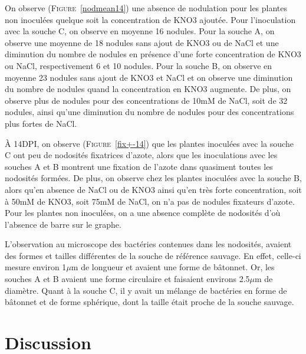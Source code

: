 \documentclass[12pt,a4paper,onecolumn]{article}
\begin{document}
\begin{multicols}{2}
			On observe (\textsc{Figure}~\ref{nodmean14}) une absence de nodulation pour les plantes non inoculées quelque soit la concentration de KNO3 ajoutée. Pour l’inoculation avec la souche C, on observe en moyenne 16 nodules. Pour la souche A, on observe une moyenne de 18 nodules sans ajout de KNO3 ou de NaCl et une diminution du nombre de nodules en présence d’une forte concentration de KNO3 ou NaCl, respectivement 6 et 10 nodules. Pour la souche B, on observe en moyenne 23 nodules sans ajout de KNO3 et NaCl et on observe une diminution du nombre de nodules quand la concentration en KNO3 augmente. De plus, on observe plus de nodules pour des concentrations de 10mM de NaCl, soit de 32 nodules, ainsi qu’une diminution du nombre de nodules pour des concentrations plus fortes de NaCl.



			À 14DPI, on observe (\textsc{Figure}~\ref{fix+-14}) que les plantes inoculées avec la souche C ont peu de nodosités fixatrices d’azote, alors que les inoculations avec les souches A et B montrent une fixation de l’azote dans quasiment toutes les nodosités formées. De plus, on observe chez les plantes inoculées avec la souche B, alors qu’en absence de NaCl ou de KNO3 ainsi qu'en très forte concentration, soit à 50mM de KNO3, soit 75mM de NaCl, on n’a pas de nodules fixateurs d’azote. Pour les plantes non inoculées, on a une absence complète de nodosités d’où l’absence de barre sur le graphe.


			L’observation au microscope des bactéries contenues dans les nodosités, avaient des formes et tailles différentes de la souche de référence sauvage. En effet, celle-ci mesure environ 1$\mu$m de longueur et avaient une forme de bâtonnet. Or, les souches A et B avaient une forme circulaire et faisaient environs 2.5$\mu$m de diamètre. Quant à la souche C, il y avait un mélange de bactéries en forme de bâtonnet et de forme sphérique, dont la taille était proche de la souche sauvage.

			\section{Discussion}


\end{multicols}
\end{document}
